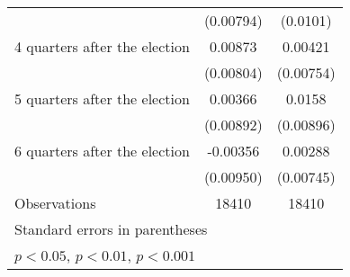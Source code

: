 \begin{table}[htbp]
\begin{tabular}{l*{2}{c}}
                    &   (0.00794)         &    (0.0101)         \\
[1em]
 4 quarters after the election&     0.00873         &     0.00421         \\
                    &   (0.00804)         &   (0.00754)         \\
[1em]
 5 quarters after the election&     0.00366         &      0.0158         \\
                    &   (0.00892)         &   (0.00896)         \\
[1em]
 6 quarters after the election&    -0.00356         &     0.00288         \\
                    &   (0.00950)         &   (0.00745)         \\
\hline
Observations        &       18410         &       18410         \\
\hline\hline
\multicolumn{3}{l}{\footnotesize Standard errors in parentheses}\\
\multicolumn{3}{l}{\footnotesize \sym{*} \(p<0.05\), \sym{**} \(p<0.01\), \sym{***} \(p<0.001\)}\\
\end{tabular}
\end{table}
